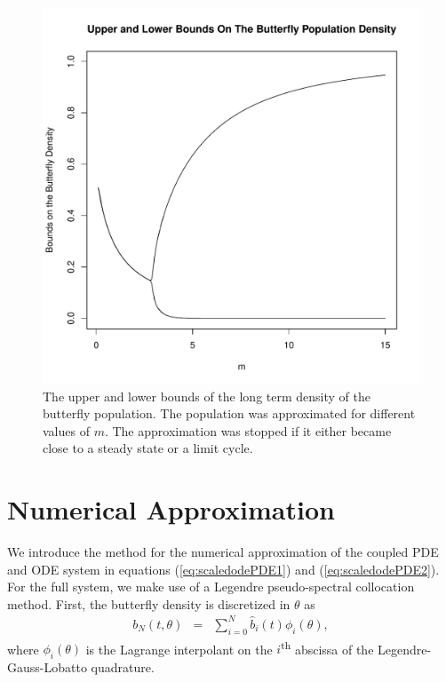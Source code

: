 \documentclass[12pt]{article}
\begin{document}
\begin{figure}[htb]
  \centering
  \includegraphics[width=12cm]{ODEButterflyBounds.pdf}
  \caption[Upper and lower bounds of the butterfly density.]{The upper
    and lower bounds of the long term density of the butterfly
    population. The population was approximated for different values
    of $m$. The approximation was stopped if it either became close to
    a steady state or a limit cycle.}
  \label{fig:odeButterflyBifurcation}
\end{figure}

\section{Numerical Approximation}

We introduce the method for the numerical approximation of the coupled
PDE and ODE system in equations (\ref{eq:scaledodePDE1}) and
(\ref{eq:scaledodePDE2}). For the full system, we make use of a
Legendre pseudo-spectral collocation method\cite{spectralMethodsFluids,hesthaven_gottlieb_gottlieb_2007,gottlieb1977numerical}. First, the butterfly density is discretized in $\theta$
as
\begin{eqnarray}
  \label{eqn:spatialDiscretization}
  b_N(t,\theta) & = & \sum^N_{i=0} \hat{b}_i(t) \phi_i(\theta),
\end{eqnarray}
where $\phi_i(\theta)$ is the Lagrange interpolant on the
$i$\textsuperscript{th} abscissa of the Legendre-Gauss-Lobatto
quadrature\cite{hesthaven_gottlieb_gottlieb_2007}.
\end{document}
